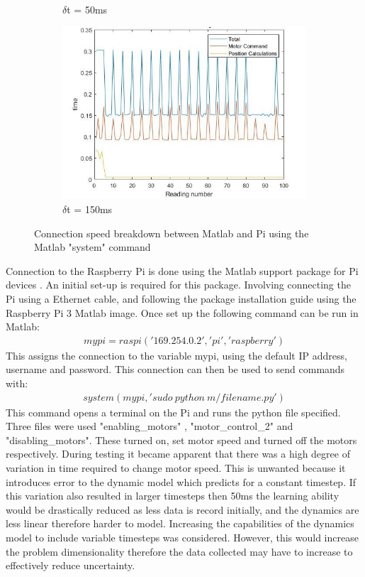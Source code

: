 \documentclass[twoside,twocolumn,12pt]{article}
\begin{document}
\begin{figure}[t]
\begin{subfigure}[t]{0.325\textwidth}
    \caption{$\delta$t = 50ms}
  \label{fig:pi50}
  \end{subfigure}
  \begin{subfigure}[t]{0.325\textwidth}
    \includegraphics[width=\linewidth]{150ms_pi}
    \caption{$\delta$t = 150ms}
  \label{fig:pi150}
  \end{subfigure}
  \caption{Connection speed breakdown between Matlab and Pi using the Matlab "system" command}
  \label{fig:pi}
\end{figure}
Connection to the Raspberry Pi is done using the Matlab support package for Pi devices \cite{pi}. An initial set-up is required for this package. Involving connecting the Pi using a Ethernet cable, and following the package installation guide using the Raspberry Pi 3 Matlab image. Once set up the following command can be run in Matlab:
\begin{gather}
mypi = raspi('169.254.0.2', 'pi', 'raspberry') \nonumber
\end{gather}
This assigns the connection to the variable mypi, using the default IP address, username and password. This connection can then be used to send commands with:
\begin{gather}
system(mypi, 'sudo \: python \: m/filename.py') \nonumber
\end{gather}
This command opens a terminal on the Pi and runs the python file specified. Three files were used \cite{motorcmd} "enabling\_motors" , "motor\_control\_2" and "disabling\_motors". These turned on, set motor speed and turned off the motors respectively.
\newline
During testing it became apparent that there was a high degree of variation in time required to change motor speed. This is unwanted because it introduces error to the dynamic model which predicts for a constant timestep. If this variation also resulted in larger timesteps then 50ms the learning ability would be drastically reduced as less data is record initially, and the dynamics are less linear therefore harder to model. Increasing the capabilities of the dynamics model to include variable timesteps was considered. However, this would increase the problem dimensionality therefore the data collected may have to increase to effectively reduce uncertainty.
\end{document}
